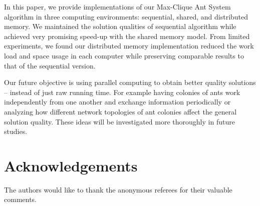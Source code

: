\documentclass[11pt]{article}
\begin{document}


In this paper, we provide implementations of our  Max-Clique Ant System algorithm in three computing environments: sequential, shared, and distributed memory.   We maintained the solution qualities of sequential algorithm while achieved very promising speed-up with the shared memory model. From limited experiments, we found our distributed memory implementation reduced the work load and space usage in each computer while preserving comparable results to that of the sequential version.

Our future objective is using parallel computing to obtain better quality solutions -- instead of just raw running time.  For example having colonies of ants work independently from one another and exchange information periodically or analyzing how different network topologies of ant colonies affect the general solution quality. These ideas will be investigated more thoroughly in future studies.  %








\section{Acknowledgements}

The authors would like to thank the anonymous referees for their valuable comments.
\end{document}
